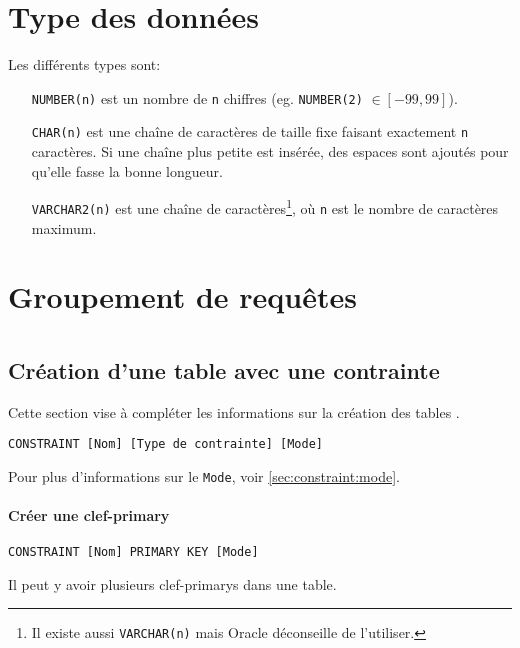 \documentclass[10pt,a4paper,french]{article}
\begin{document}
\section{Type des données}\label{sec:types}

Les différents types sont:
\begin{itemize}
\item[\tt NUMBER(n)] est un nombre de {\tt n} chiffres (eg. {\tt NUMBER(2)} $\in [-99,99]$).
\item[\tt CHAR(n)] est une chaîne de caractères de taille fixe faisant exactement {\tt n} caractères. Si une chaîne plus petite est insérée, des espaces sont ajoutés pour qu'elle fasse la bonne longueur.
\item[\tt VARCHAR2(n)] est une chaîne de caractères\footnote{Il existe aussi {\tt VARCHAR(n)} mais Oracle déconseille de l'utiliser.}, où {\tt n} est le nombre de caractères maximum.
\end{itemize}

\section{Groupement de requêtes}

\section{}\label{sec:constraint}

\subsection{Création d'une table avec une contrainte}\label{sec:constraint:add}

Cette section vise à compléter les informations sur la création des tables .
\begin{verbatim}
CONSTRAINT [Nom] [Type de contrainte] [Mode]
\end{verbatim}
Pour plus d'informations sur le {\tt Mode}, voir \cref{sec:constraint:mode}.

\paragraph{Créer une \gls{clef-primary}}
\begin{verbatim}
CONSTRAINT [Nom] PRIMARY KEY [Mode]
\end{verbatim}
Il peut y avoir plusieurs \glspl{clef-primary} dans une table.
\end{document}
